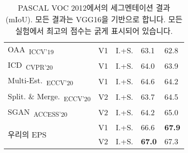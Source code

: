 \begin{table}[]
{\begin{tabular}{@{}lccll@{}}
\multicolumn{1}{l}{OAA~\cite{jiang2019integral}\textsubscript{ICCV'19}}                 & V1        & I.+S. & 63.1                    & 62.8                     \\
\multicolumn{1}{l}{ICD~\cite{fan2020learning}\textsubscript{CVPR'20}}                   & V1        & I.+S. & 64.0                    & 63.9                     \\
\multicolumn{1}{l}{Multi-Est.~\cite{fan2020employing}\textsubscript{ECCV'20}}           & V1        & I.+S. & 64.6                    & 64.2                     \\
\multicolumn{1}{l}{Split. \& Merge.~\cite{zhang2020splitting}\textsubscript{ECCV'20}}   & V2        & I.+S. & 63.7                    & 64.5                     \\
\multicolumn{1}{l}{SGAN~\cite{yao2020saliency}\textsubscript{ACCESS'20}}                & V2        & I.+S. & 64.2                    & 65.0                     \\ \midrule
\multicolumn{1}{l}{\multirow{2}{*}{우리의 EPS}}                                            & V1        & I.+S. & 66.6                    & \textbf{67.9}            \\
\multicolumn{1}{l}{}                                                                    & V2        & I.+S. & \textbf{67.0}           & 67.3                     \\ \bottomrule

\end{tabular}
}
\vspace{2mm}
\caption{PASCAL VOC 2012에서의 세그멘테이션 결과 (mIoU). 모든 결과는 VGG16을 기반으로 합니다. 모든 실험에서 최고의 점수는 굵게 표시되어 있습니다.}\vspace{-3mm}
\label{tab:seg_quan_voc_vgg16}
\end{table}

